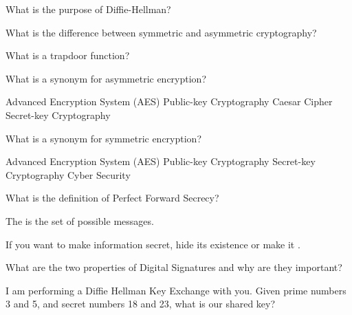 \documentclass{exam}
\begin{document}
\begin{questions}

  \question[12] 
  What is the purpose of Diffie-Hellman?
  \fillwithlines{.8in}

  \question[10]
  What is the difference between symmetric and asymmetric cryptography?
  \fillwithlines{1.2in}

  \question[10]
  What is a trapdoor function?
  \fillwithlines{1.2in}


  \question[3]
  What is a synonym for asymmetric encryption?
  \begin{choices}
    \choice Advanced Encryption System (AES)
    \choice Public-key Cryptography 
    \choice Caesar Cipher
    \choice Secret-key Cryptography
  \end{choices}

  \question[3]
  What is a synonym for symmetric encryption?
  \begin{choices}
    \choice Advanced Encryption System (AES)
    \choice Public-key Cryptography 
    \choice Secret-key Cryptography
    \choice Cyber Security
  \end{choices}

  \question[10]
  What is the definition of Perfect Forward Secrecy?
  \fillwithlines{1.2in}

  \question[5] The  is the set of possible messages.

  \question[5] If you want to make information secret, hide its existence
  or make it \fillin[intelligible].

  \question[17]
  What are the two properties of Digital Signatures and why are they important?
  \fillwithlines{2in}

  \question[25] I am performing a Diffie Hellman Key Exchange with you. Given prime numbers 3 and 5, and secret numbers 18 and 23, 
  what is our shared key?


\end{questions}
\end{document}
